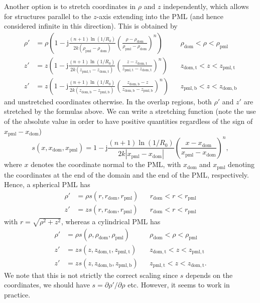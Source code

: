\documentclass[a4paper,12pt]{article}
\newcommand{\mrm}[1]{\mathrm{#1}}
\newcommand{\ju}{\mrm{j}}
\begin{document}
Another option is to stretch coordinates in $\rho$ and $z$
independently, which allows for structures parallel to the $z$-axis
extending into the PML (and hence considered infinite in this
direction). This is obtained by
\begin{align}
  \rho' &= \rho\left( 1 - \ju \frac{(n+1)\ln(1/R_{0})}{2k(\rho_{\mrm{pml}} - \rho_{\mrm{dom}})} \left(\frac{\rho-\rho_{\mrm{dom}}}{\rho_{\mrm{pml}} - \rho_{\mrm{dom}}}\right)^{n}\right) && \rho_{\mrm{dom}} < \rho < \rho_{\mrm{pml}} \\
  z' &= z\left( 1 - \ju \frac{(n+1)\ln(1/R_{0})}{2k(z_{\mrm{pml,t}} - z_{\mrm{dom,t}})} \left(\frac{z-z_{\mrm{dom,t}}}{z_{\mrm{pml,t}} - z_{\mrm{dom,t}}}\right)^{n}\right) && z_{\mrm{dom,t}} < z < z_{\mrm{pml,t}} \\
  z' &= z\left( 1 - \ju \frac{(n+1)\ln(1/R_{0})}{2k(z_{\mrm{dom,b}} - z_{\mrm{pml,b}})} \left(\frac{z_{\mrm{dom,b}}-z}{z_{\mrm{dom,b}} - z_{\mrm{pml,b}}}\right)^{n}\right) && z_{\mrm{pml,b}} < z < z_{\mrm{dom,b}} 
\end{align}
and unstretched coordinates otherwise. In the overlap regions, both
$\rho'$ and $z'$ are stretched by the formulas above. We can write a
stretching function (note the use of the absolute value in order to
have positive quantities regardless of the sign of
$x_{\mrm{pml}}-x_{\mrm{dom}}$)
\begin{equation}
  s(x,x_{\mrm{dom}},x_{\mrm{pml}}) = 1 - \ju\frac{(n+1)\ln(1/R_{0})}{2k|x_{\mrm{pml}} - x_{\mrm{dom}}|} \left(\frac{x-x_{\mrm{dom}}}{x_{\mrm{pml}} - x_{\mrm{dom}}}\right)^{n},
\end{equation}
where $x$ denotes the coordinate normal to the PML, with
$x_{\mrm{dom}}$ and $x_{\mrm{pml}}$ denoting the coordinates at the
end of the domain and the end of the PML, respectively. Hence, a
spherical PML has
\begin{align}
  \rho' &= \rho s(r,r_{\mrm{dom}},r_{\mrm{pml}}) && r_{\mrm{dom}} < r < r_{\mrm{pml}} \\
  z' &= z s(r,r_{\mrm{dom}},r_{\mrm{pml}}) && r_{\mrm{dom}} < r < r_{\mrm{pml}}
\end{align}
with $r = \sqrt{\rho^{2} + z^{2}}$, whereas a cylindrical PML has
\begin{align}
  \rho' &= \rho s(\rho,\rho_{\mrm{dom}},\rho_{\mrm{pml}}) && \rho_{\mrm{dom}} < \rho < \rho_{\mrm{pml}} \\
  z' &= z s(z,z_{\mrm{dom,t}},z_{\mrm{pml,t}}) && z_{\mrm{dom,t}} < z < z_{\mrm{pml,t}} \\
  z' &= z s(z,z_{\mrm{dom,b}},z_{\mrm{pml,b}}) && z_{\mrm{pml,t}} < z < z_{\mrm{dom,t}}. 
\end{align}
We note that this is not strictly the correct scaling since $s$
depends on the coordinates, we should have
$s=\partial \rho'/\partial\rho$ etc. However, it seems to work in
practice.
\end{document}

